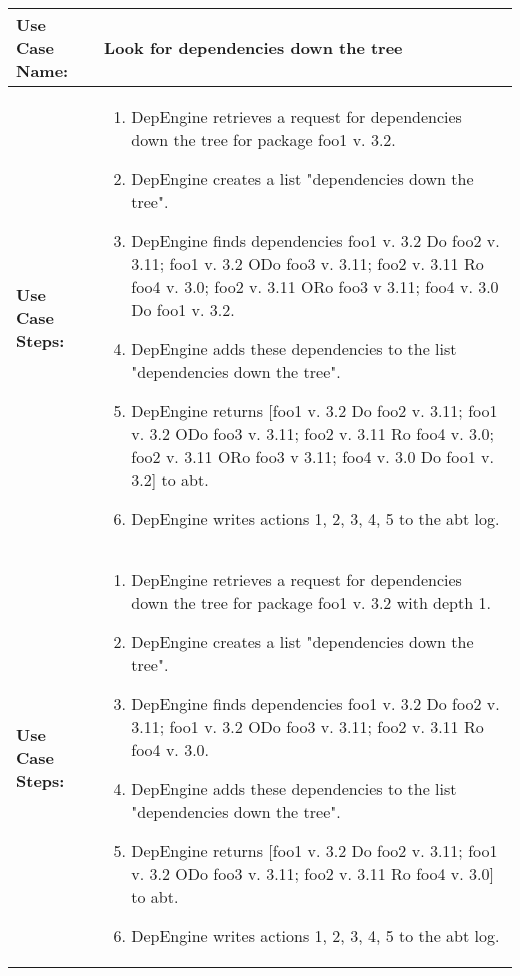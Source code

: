 
\begin{tabularx}{\linewidth}{|l|X|}
\hline
\textbf{Use Case Name:} & \textbf{Look for dependencies down the tree} \\
\hline
\textbf{Use Case Steps:} & 
\begin{minipage}{\linewidth} 
 \vspace{0.05em}
  \begin{enumerate}
   \item DepEngine retrieves a request for dependencies down the tree for package foo1 v. 3.2.
   \item DepEngine creates a list "dependencies down the tree".
   \item DepEngine finds dependencies foo1 v. 3.2 Do foo2 v. 3.11; foo1 v. 3.2 ODo foo3 v. 3.11; foo2 v. 3.11 Ro foo4 v. 3.0; foo2 v. 3.11 ORo foo3 v 3.11; foo4 v. 3.0 Do foo1 v. 3.2.
   \item DepEngine adds these dependencies to the list "dependencies down the tree".
   \item DepEngine returns [foo1 v. 3.2 Do foo2 v. 3.11; foo1 v. 3.2 ODo foo3 v. 3.11; foo2 v. 3.11 Ro foo4 v. 3.0; foo2 v. 3.11 ORo foo3 v 3.11; foo4 v. 3.0 Do foo1 v. 3.2] to abt.
   \item DepEngine writes actions 1, 2, 3, 4, 5 to the abt log.
  \end{enumerate}
 \vspace{0.05em}
\end{minipage}
\\
\hline 
\textbf{Use Case Steps:} & 
\begin{minipage}{\linewidth} 
 \vspace{0.05em}
  \begin{enumerate}
   \item DepEngine retrieves a request for dependencies down the tree for package foo1 v. 3.2 with depth 1. 
   \item DepEngine creates a list "dependencies down the tree".
   \item DepEngine finds dependencies foo1 v. 3.2 Do foo2 v. 3.11; foo1 v. 3.2 ODo foo3 v. 3.11; foo2 v. 3.11 Ro foo4 v. 3.0.
   \item DepEngine adds these dependencies to the list "dependencies down the tree".
   \item DepEngine returns [foo1 v. 3.2 Do foo2 v. 3.11; foo1 v. 3.2 ODo foo3 v. 3.11; foo2 v. 3.11 Ro foo4 v. 3.0] to abt.
   \item DepEngine writes actions 1, 2, 3, 4, 5 to the abt log.
  \end{enumerate}
 \vspace{0.05em}
\end{minipage}
\\
\hline 
\end{tabularx}
